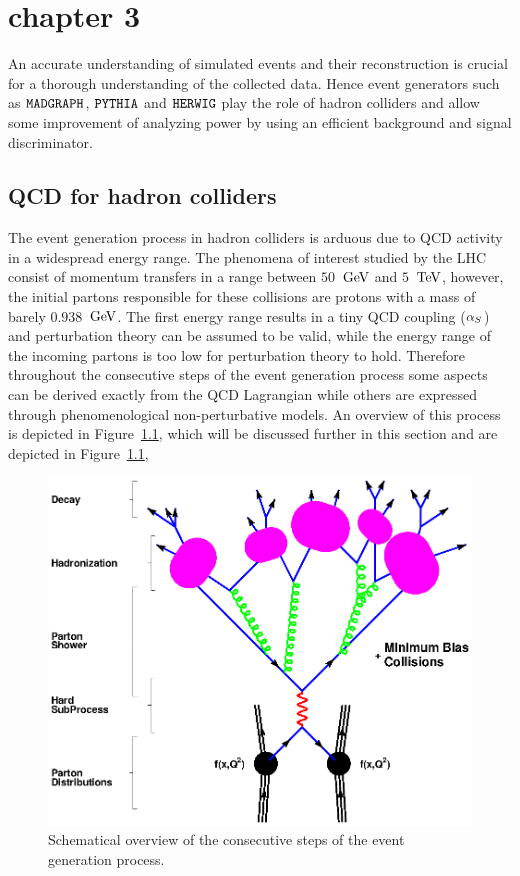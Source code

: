 \chapter{chapter 3} \label{chp:labelTitle}

An accurate understanding of simulated events and their reconstruction is crucial for a thorough understanding of the collected data. Hence event generators such as $\texttt{MADGRAPH}$, $\texttt{PYTHIA}$ and $\texttt{HERWIG}$ play the role of hadron colliders and allow some improvement of analyzing power by using an efficient background and signal discriminator.

\section{QCD for hadron colliders} \label{sec::QCDHadron}

The event generation process in hadron colliders is arduous due to QCD activity in a widespread energy range. The phenomena of interest studied by the LHC consist of momentum transfers in a range between $50$ $\, \mathrm{GeV}$ and $5$ $\, \mathrm{TeV}$, however, the initial partons responsible for these collisions are protons with a mass of barely $0.938$ $\, \mathrm{GeV}$. The first energy range results in a tiny QCD coupling ($\alpha_{S}$) and perturbation theory can be assumed to be valid, while the energy range of the incoming partons is too low for perturbation theory to hold. Therefore throughout the consecutive steps of the event generation process some aspects can be derived exactly from the QCD Lagrangian while others are expressed through phenomenological non-perturbative models. An overview of this process is depicted in Figure~\ref{fig::EvtShower}, which will be discussed further in this section and are depicted in Figure~\ref{fig::EvtShower},%

\begin{figure}[htb]
 \centering
 \includegraphics[width = 0.8 \textwidth]{Chapters/Chapter3/Figures/f_shg_event.eps}
 \caption{Schematical overview of the consecutive steps of the event generation process.}  \label{fig::EvtShower}
\end{figure}

